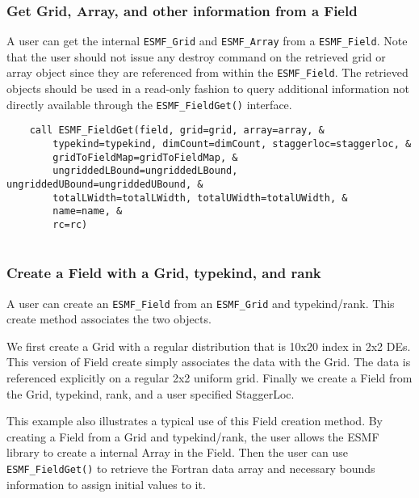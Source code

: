 
  \subsubsection{Get Grid, Array, and other information from a Field}
  \label{sec:field:usage:field_get_default}
  
    A user can get the internal {\tt ESMF\_Grid} and {\tt ESMF\_Array}
    from a {\tt ESMF\_Field}.  Note that the user should not issue any destroy command
    on the retrieved grid or array object since they are referenced
    from within the {\tt ESMF\_Field}. The retrieved objects should be used
    in a read-only fashion to query additional information not directly
    available through the {\tt ESMF\_FieldGet()} interface.
   

 \begin{verbatim}
    call ESMF_FieldGet(field, grid=grid, array=array, &
        typekind=typekind, dimCount=dimCount, staggerloc=staggerloc, &
        gridToFieldMap=gridToFieldMap, &
        ungriddedLBound=ungriddedLBound, ungriddedUBound=ungriddedUBound, &
        totalLWidth=totalLWidth, totalUWidth=totalUWidth, &
        name=name, &
        rc=rc)
 
\end{verbatim}
 

  \subsubsection{Create a Field with a Grid, typekind, and rank}
  \label{sec:field:usage:create_grid_tkr}
  
    A user can create an {\tt ESMF\_Field} from an {\tt ESMF\_Grid} and
    typekind/rank.
    This create method associates the two objects.
  
    We first create a Grid with a regular distribution that is
    10x20 index in 2x2 DEs.  This version of Field create simply
    associates the data with the Grid.  The data is referenced
    explicitly on a regular 2x2 uniform grid.
    Finally we create a Field from
    the Grid, typekind, rank, and a user specified StaggerLoc.
  
    This example also illustrates a typical use of this Field creation
    method. By creating a Field from a Grid and typekind/rank, the
    user allows the ESMF library to create a internal Array in the Field.
    Then the user can use {\tt ESMF\_FieldGet()} to retrieve the Fortran
    data array
    and necessary bounds information to assign initial values to it. 

